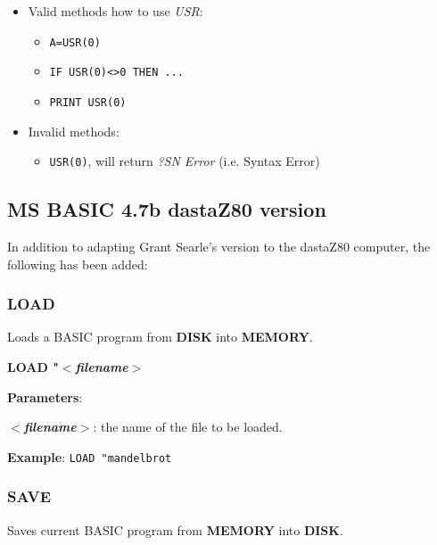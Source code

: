         \begin{itemize}
            \item Valid methods how to use \textit{USR}:
            \begin{itemize}
                \item \texttt{A=USR(0)}
                \item \texttt{IF USR(0)<>0 THEN ...}
                \item \texttt{PRINT USR(0)}
            \end{itemize}
            \item Invalid methods:
            \begin{itemize}
                \item \texttt{USR(0)}, will return \textit{?SN Error} (i.e. Syntax Error)
            \end{itemize}
        \end{itemize}

    \subsection{MS BASIC 4.7b dastaZ80 version}

    In addition to adapting Grant Searle's version to the dastaZ80 computer,
    the following has been added:

        \subsubsection{{LOAD}}
        Loads a BASIC program from \textbf{DISK} into \textbf{MEMORY}.

        \hspace{1.9cm}\textbf{LOAD "\textit{$<$filename$>$}}

        \textbf{Parameters}:

        \hspace{1cm}\textbf{\textit{$<$filename$>$}}: the name of the file to be
        loaded.

        \textbf{Example}: \texttt{LOAD "mandelbrot}

        \subsubsection{{SAVE}}
        Saves current BASIC program from \textbf{MEMORY} into \textbf{DISK}.

